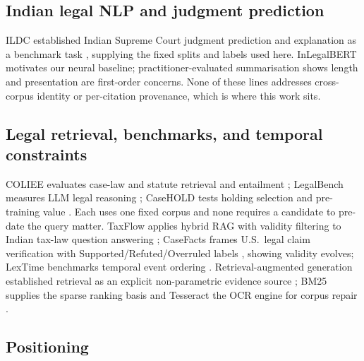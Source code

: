 \documentclass[conference]{IEEEtran}
\begin{document}
\subsection{Indian legal NLP and judgment prediction}

ILDC established Indian Supreme Court judgment prediction and
explanation as a benchmark task \cite{malik2021}, supplying the fixed splits
and labels used here. InLegalBERT \cite{paul2023} motivates our neural
baseline; practitioner-evaluated summarisation \cite{shukla2022}
shows length and presentation are first-order concerns. None of
these lines addresses cross-corpus identity or per-citation
provenance, which is where this work sits.

\subsection{Legal retrieval, benchmarks, and temporal constraints}

COLIEE evaluates case-law and statute retrieval and entailment \cite{coliee2023};
LegalBench measures LLM legal reasoning \cite{legalbench2023}; CaseHOLD tests
holding selection and pre-training value \cite{casehold2021}. Each uses one
fixed corpus and none requires a candidate to pre-date the query matter.
TaxFlow applies hybrid RAG with validity filtering to Indian tax-law
question answering \cite{taxflow2026}; CaseFacts frames U.S.\ legal claim
verification with Supported/Refuted/Overruled labels \cite{casefacts2026},
showing validity evolves; LexTime benchmarks temporal event ordering
\cite{lextime2025}. Retrieval-augmented generation
established retrieval as an explicit non-parametric evidence source
\cite{lewis2020}; BM25 supplies the sparse ranking basis \cite{robertson2009}
and Tesseract the OCR engine for corpus repair \cite{smith2007}.

\subsection{Positioning}
\end{document}
